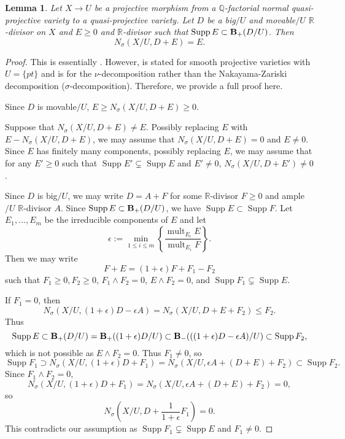 \documentclass[12pt]{amsart}
\newcommand{\liu}[1]{{\textcolor{magenta}{[Liu: #1]}}}
\newcommand{\calum}[1]{{\textcolor{blue}{[Calum: #1]}}}
\numberwithin{equation}{section}
\newcommand{\Qq}{\mathbb{Q}}
\newcommand{\Rr}{\mathbb{R}}
\newcommand{\Supp}{\operatorname{Supp}}
\newcommand{\mult}{\operatorname{mult}}
\newcommand{\Bb}{{\bf{B}}}
\newtheorem{lem}[thm]{Lemma}
\theoremstyle{definition}
\theoremstyle{definition}
\theoremstyle{definition}
\begin{document}
\begin{lem}\label{lem: sbl of movable big divisor}
Let $X\rightarrow U$ be a projective morphism from a $\Qq$-factorial normal quasi-projective variety to a quasi-projective variety. Let $D$ be a big$/U$ and movable$/U$ $\Rr$-divisor on $X$ and $E\geq 0$ and $\Rr$-divisor such that $\Supp E\subset\Bb_+(D/U)$. Then
$$N_{\sigma}(X/U,D+E)=E.$$
\end{lem}
\begin{proof}
This is essentially \cite[Lemma 3.5]{Nak04}. However, \cite[Lemma 3.5]{Nak04} is stated for smooth projective varieties with $U=\{pt\}$ and is for the $\nu$-decomposition rather than the Nakayama-Zariski decomposition ($\sigma$-decomposition). Therefore, we provide a full proof here.

Since $D$ is movable$/U$, $E\geq N_{\sigma}(X/U,D+E)\geq 0$. 

Suppose that $N_{\sigma}(X/U,D+E)\not=E$. Possibly replacing $E$ with $E-N_{\sigma}(X/U,D+E)$, we may assume that $N_{\sigma}(X/U,D+E)=0$ and $E\not=0$. Since $E$ has finitely many components, possibly replacing $E$, we may assume that for any $E'\geq 0$ such that $\Supp E'\subsetneq\Supp E$ and $E'\not=0$, $N_{\sigma}(X/U,D+E')\not=0$.

Since $D$ is big$/U$, we may write $D=A+F$ for some $\Rr$-divisor $F\geq 0$ and ample$/U$ $\Rr$-divisor $A$. Since $\Supp E\subset\Bb_+(D/U)$, we have $\Supp E\subset\Supp F$. Let $E_1,\dots,E_m$ be the irreducible components of $E$ and let
$$\epsilon:=\min_{1\leq i\leq m}\left\{\frac{\mult_{E_i}E}{\mult_{E_i}F}\right\}.$$
Then we may write
$$F+E=(1+\epsilon)F+F_1-F_2$$
such that $F_1\geq 0,F_2\geq 0$, $F_1\wedge F_2=0$, $E\wedge F_2=0$, and $\Supp F_1\subsetneq\Supp E$.


If $F_1=0$, then 
$$N_{\sigma}(X/U,(1+\epsilon)D-\epsilon A)=N_{\sigma}(X/U,D+E+F_2)\leq F_2.$$
Thus 
$$\Supp E\subset\Bb_+(D/U)=\Bb_+((1+\epsilon)D/U)\subset\Bb_-(((1+\epsilon)D-\epsilon A)/U)\subset\Supp F_2,$$
which is not possible as $E\wedge F_2=0$. Thus $F_1\not=0$, so 
$$\Supp F_1\supset N_{\sigma}(X/U,(1+\epsilon)D+F_1)=N_{\sigma}(X/U,\epsilon A+(D+E)+F_2)\subset\Supp F_2.$$
Since $F_1\wedge F_2=0$,
$$N_{\sigma}(X/U,(1+\epsilon)D+F_1)=N_{\sigma}(X/U,\epsilon A+(D+E)+F_2)=0,$$
so 
$$N_{\sigma}\left(X/U,D+\frac{1}{1+\epsilon}F_1\right)=0.$$
This contradicts our assumption as $\Supp F_1\subsetneq\Supp E$ and $F_1\not=0$. 
\end{proof}
\end{document}
